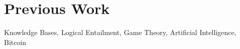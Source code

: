 \section{Previous Work}\label{previous work}

Knowledge Bases, Logical Entailment, Game Theory, Artificial Intelligence, Bitcoin
